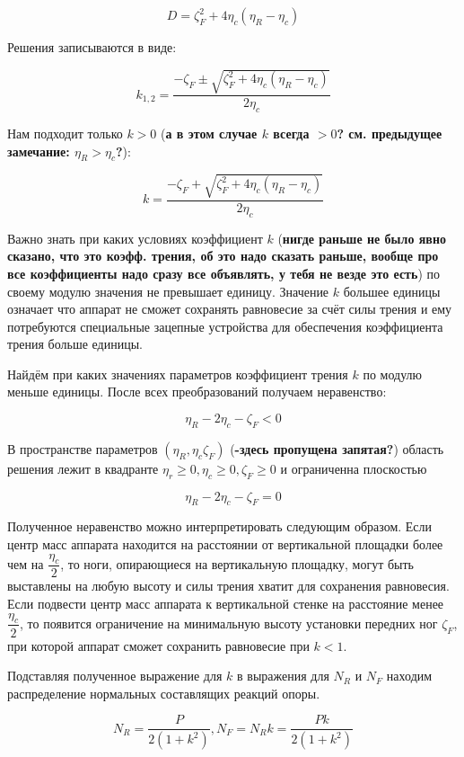 $$
D = \zeta_F^2+4\eta_c(\eta_R-\eta_c)
$$

Решения записываются в виде:

\begin{equation}
k_{1,2} = \dfrac{-\zeta_F\pm\sqrt{\zeta_F^2+4\eta_c(\eta_R-\eta_c)}}{2\eta_c}
\end{equation}

Нам подходит только $k>0$ (\textbf{а в этом случае $k$ всегда $>0$? см. предыдущее замечание: $\eta_R>\eta_c$?}):

$$
k = \dfrac{-\zeta_F+\sqrt{\zeta_F^2+4\eta_c(\eta_R-\eta_c)}}{2\eta_c}
$$

Важно знать при каких условиях коэффициент $k$ (\textbf{нигде раньше не было явно сказано, что это коэфф. трения, об это надо сказать раньше, вообще про все коэффициенты надо сразу все объявлять, у тебя не везде это есть}) по своему модулю значения не превышает единицу. Значение $k$ большее единицы означает что аппарат не сможет сохранять равновесие за счёт силы трения и ему потребуются специальные зацепные устройства для обеспечения коэффициента трения больше единицы.

Найдём при каких значениях параметров коэффициент трения $k$ по модулю меньше единицы. После всех преобразований получаем неравенство:

\begin{equation}
\eta_R-2\eta_c-\zeta_F < 0
\end{equation}

В пространстве параметров $(\eta_R,\eta_c\zeta_F)$ (\textbf{-здесь пропущена запятая?}) область решения лежит в квадранте $\eta_r\geq0, \eta_c\geq0,\zeta_F\geq0$ и ограниченна плоскостью

$$
\eta_R-2\eta_c-\zeta_F = 0
$$

Полученное неравенство можно интерпретировать следующим образом. Если центр масс аппарата находится на расстоянии от вертикальной площадки более чем на $\dfrac{\eta_c}{2}$, то ноги, опирающиеся на вертикальную площадку, могут быть выставлены на любую высоту и силы трения хватит для сохранения равновесия. Если подвести центр масс аппарата к вертикальной стенке на расстояние менее $\dfrac{\eta_c}{2}$, то появится ограничение на минимальную высоту установки передних ног $\zeta_F$, при которой аппарат сможет сохранить равновесие при $k<1$.

Подставляя полученное выражение для $k$ в выражения для $N_R$ и $N_F$ находим распределение нормальных составлящих реакций опоры.

$$
N_R = \dfrac{P}{2(1+k^2)}, N_F = N_Rk = \dfrac{Pk}{2(1+k^2)}
$$

